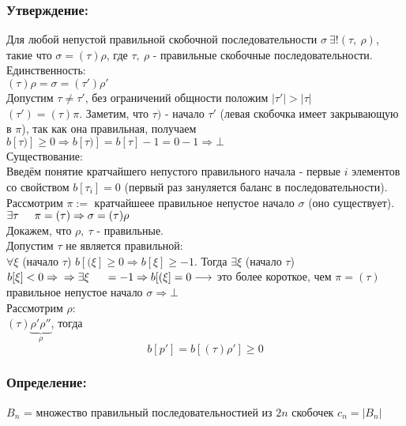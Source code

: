 \documentclass[12pt, letterpaper, twoside]{article}
\begin{document}
    \subsubsection*{Утверждение:}
    Для любой непустой правильной скобочной последовательности $\sigma\ \exists! (\tau,\ \rho)$, такие что $\sigma = (\tau)\rho$, где $\tau,\ \rho$ - правильные скобочные последовательности.\\
    Единственность:\\
    $(\tau) \rho = \sigma = (\tau ')\rho '$\\
    Допустим $\tau \neq \tau '$, без ограничений общности положим $|\tau'| > |\tau|$\\
    $(\tau ') = (\tau) \pi$. Заметим, что $\tau)$ - начало $\tau'$ (левая скобочка имеет закрывающую в $\pi$), так как она правильная, получаем $b[\tau)]\geq 0\Rightarrow b[\tau)] = b[\tau] - 1 = 0 - 1\Rightarrow \bot$\\
    Существование:\\
    Введём понятие кратчайшего непустого правильного начала - первые $i$ элементов со свойством $b[\tau_i] = 0$ (первый раз зануляется баланс в последовательности).\\
    Рассмотрим $\pi :=$ кратчайшеее правильное непустое начало $\sigma$ (оно существует).\\
    $\exists \tau\hspace{0.5cm}\pi = (\tau)\Rightarrow \sigma = (\tau)\rho$ \\
    Докажем, что $\rho,\ \tau$ - правильные.\\
    Допустим $\tau$ не является правильной:\\
    $\forall \xi$ (начало $\tau$) $b[(\xi] \geq 0\Rightarrow b[\xi] \geq -1$. Тогда $\exists \xi$ (начало $\tau$) $b[\xi] < 0\Rightarrow\\
    \Rightarrow \exists \xi\hspace{0.5cm} = -1\Rightarrow b[(\xi] = 0 \longrightarrow$ это более короткое, чем $\pi = (\tau)$ правильное непустое начало $\sigma\Rightarrow \bot$\\
    Рассмотрим $\rho$:\\
    $(\tau)\underset{\rho}{\underbrace{\rho' \rho''}}$, тогда
    \[b[p'] = b[(\tau) \rho'] \geq 0\]

    \subsubsection*{Определение:}
    $B_n$ = множество правильный последовательностией из $2n$ скобочек $c_n = |B_n|$
\end{document}
